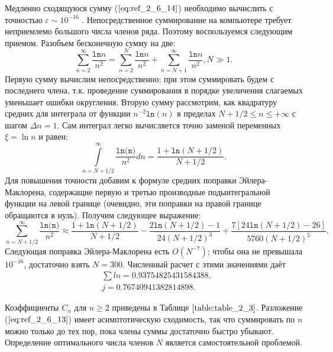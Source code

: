 Медленно сходящуюся сумму ($\ref{eq:ref_2_6_14}$) необходимо вычислить с точностью $\varepsilon \sim 10^{-16}$ .
Непосредственное суммирование на компьютере требует неприемлемо
большого числа членов ряда. Поэтому воспользуемся следующим приемом.
Разобъем бесконечную сумму на две:
\begin{equation}
\sum\limits_{n=2}^{\infty} \frac{\texttt{ln}n}{n^2} = \sum\limits_{n=2}^{N} \frac{\texttt{ln}n}{n^2} + \sum\limits_{n=N+1}^{\infty} \frac{\texttt{ln}n}{n^2}, N \gg 1.
\label{eq:ref_2_6_15}
\end{equation}
Первую сумму вычислим непосредственно; при этом суммировать будем с
последнего члена, т.к. проведение суммирования в порядке увеличения
слагаемых уменьшает ошибки округления. Вторую сумму рассмотрим, как
квадратуру средних для интеграла от функции $n^{-2}\texttt{ln}(n)$ в пределах
$N + 1/ 2 \leqslant n \leqslant +\infty$ с шагом $\Delta n=1$. Сам интеграл легко вычисляется точно
заменой переменных $\xi=\ln n $ и равен:
\begin{equation}
\int\limits_{n=N+1/2}^{\infty} \frac{\texttt{ln(n)}}{n^2} dn = \frac{1+\texttt{ln}(N + 1/2)}{N + 1/2}.
\label{eq:ref_2_6_16}
\end{equation}
Для повышения точности добавим к формуле средних поправки Эйлера-
Маклорена, содержащие первую и третью производные подынтегральной
функции на левой границе (очевидно, эти поправки на правой границе
обращаются в нуль). Получим следующее выражение:
\begin{equation}
\sum\limits_{n=N+1/2}^{\infty} \frac{\texttt{ln(n)}}{n^2} \approx \frac{1+\texttt{ln}(N+1/2)}{N+1/2} - \frac{2\texttt{ln}(N+1/2)-1}{24(N+1/2)^3} + \frac{7[24\texttt{ln}(N+1/2) - 26]}{5760(N+1/2)^5}.
\label{eq:ref_2_6_17}
\end{equation}
Следующая поправка Эйлера-Маклорена есть $O(N^{-7})$; чтобы она не превышала
$10^{-16}$, достаточно взять $N = 300$. Численный расчет с этими значениями даёт
\begin{equation}
\begin{aligned}
&\sum ln = 0.93754825431584388, \\
&j = 0.76740941382814898.
\end{aligned}
\label{eq:ref_2_6_18}
\end{equation}

Коэффициенты $C_n$ для $n \geqslant 2$ приведены в Таблице $\ref{table:table_2_3}$. Разложение ($\ref{eq:ref_2_6_13}$)
имеет асимптотическую сходимость, так что суммировать по $n$ можно только
до тех пор, пока члены суммы достаточно быстро убывают. Определение
оптимального числа членов $N$ является самостоятельной проблемой.
